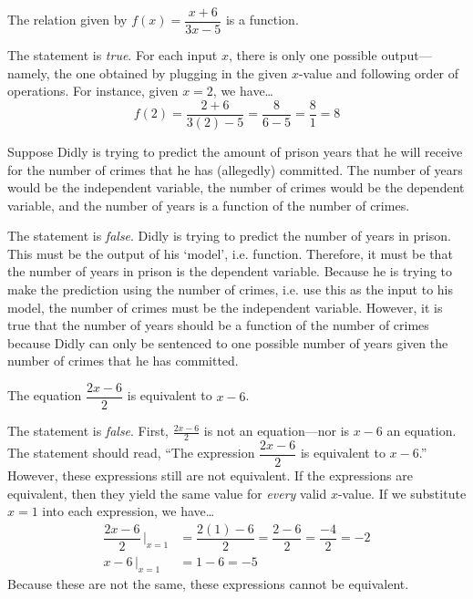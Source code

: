 \documentclass[11pt,letterpaper]{article}
\begin{document}
\thispagestyle{title}

 The relation given by $f(x)= \dfrac{x + 6}{3x - 5}$ is a function. \pspace

\sol The statement is \textit{true}. For each input $x$, there is only one possible output---namely, the one obtained by plugging in the given $x$-value and following order of operations. For instance, given $x= 2$, we have\dots
	\[
	f(2)= \dfrac{2 + 6}{3(2) - 5}= \dfrac{8}{6 - 5}= \dfrac{8}{1}= 8
	\] \pvspace{1.3cm}



 Suppose Didly is trying to predict the amount of prison years that he will receive for the number of crimes that he has (allegedly) committed. The number of years would be the independent variable, the number of crimes would be the dependent variable, and the number of years is a function of the number of crimes. \pspace

\sol The statement is \textit{false}. Didly is trying to predict the number of years in prison. This must be the output of his `model', i.e. function. Therefore, it must be that the number of years in prison is the dependent variable. Because he is trying to make the prediction using the number of crimes, i.e. use this as the input to his model, the number of crimes must be the independent variable. However, it is true that the number of years should be a function of the number of crimes because Didly can only be sentenced to one possible number of years given the number of crimes that he has committed. \pvspace{1.3cm}




 The equation $\dfrac{2x - 6}{2}$ is equivalent to $x - 6$. \pspace

\sol The statement is \textit{false}. First, $\frac{2x - 6}{2}$ is not an equation---nor is $x - 6$ an equation. The statement should read, ``The expression $\dfrac{2x - 6}{2}$ is equivalent to $x - 6$.'' However, these expressions still are not equivalent. If the expressions are equivalent, then they yield the same value for \textit{every} valid $x$-value. If we substitute $x= 1$ into each expression, we have\dots
	\[
	\begin{aligned}
	\dfrac{2x - 6}{2} \, \bigg|_{x= 1}&= \dfrac{2(1) - 6}{2}= \dfrac{2 - 6}{2}= \dfrac{-4}{2}= -2 \\[0.2cm]
	x - 6 \, \bigg|_{x= 1}&= 1 - 6= -5
	\end{aligned}
	\]
Because these are not the same, these expressions cannot be equivalent. \pvspace{1.3cm}
\end{document}
